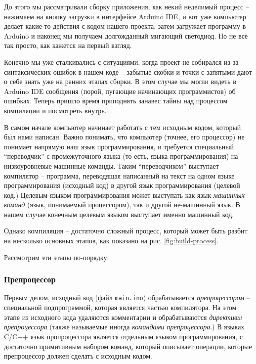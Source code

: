 \documentclass[../sparc.tex]{subfiles}
\begin{document}

До этого мы рассматривали сборку приложения, как некий неделимый процесс --
нажимаем на кнопку загрузки в интерфейсе Arduino IDE, и вот уже компьютер делает
какие-то действия с кодом нашего проекта, затем загружает программу в Arduino и
наконец мы получаем долгожданный мигающий светодиод.  Но не всё так просто, как
кажется на первый взгляд.

Конечно мы уже сталкивались с ситуациями, когда проект не собирался из-за
синтаксических ошибок в нашем коде -- забытые скобки и точки с запятыми дают о
себе знать уже на ранних этапах сборки.  В этом случае мы могли видеть в Arduino
IDE сообщения (порой, пугающие начинающих программистов) об ошибках.  Теперь
пришло время приподнять занавес тайны над процессом компиляции и посмотреть
внутрь.

В самом начале компьютер начинает работать с тем исходным кодом, который был
нами написан.  Важно понимать, что компьютер (точнее, его процессор) не понимает
напрямую наш язык программирования, и требуется специальный ``переводчик'' с
промежуточного языка (то есть, языка программирования) на низкоуровневые
машинные команды.  Таким ``переводчиком'' выступает \gls{компилятор} --
программа, переводящая написанный на текст на одном языке программирования
(исходный код) в другой язык программирования (целевой код.)  Целевым языком
программирования может выступать как язык \emph{машинных команд} (язык,
понимаемый процессором), так и другой не-машинный язык.  В нашем случае конечным
целевым языком выступает именно машинный код.

Однако компиляция -- достаточно сложный процесс, который может быть разбит на
несколько основных этапов, как показано на рис. \ref{fig:build-process}.


Рассмотрим эти этапы по-порядку.

\subsubsection{Препроцессор}

Первым делом, исходный код (файл \texttt{main.ino}) обрабатывается
\emph{препроцессором} -- специальной подпрограммой, которая является частью
компилятора.  На этом этапе из исходного кода удаляются комментарии и
обрабатываются \emph{директивы препроцессора} (также называемые иногда
\emph{командами препроцессора}.)  В языках C/C++ язык пропроцессора является
отдельным языком программирования, с достаточно примитивным набором команд,
который описывает операции, которые препроцессор должен сделать с исходным
кодом.
\end{document}
